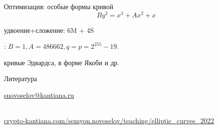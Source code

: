 \documentclass{beamer}
\begin{document}
	\begin{frame}{Оптимизация: особые формы кривой}
		\[
		B y^2 = x^3 + A x^2 + x
		\]
		\begin{center}
			\begin{tcolorbox}[enhanced,hbox,colback=box-blue-color!15,colframe=box-blue-color,title=Сложность,center title]
				\begin{varwidth}{\textwidth}
					удвоение+сложение: $6$M + $4$S
				\end{varwidth}
			\end{tcolorbox}	
		\end{center}
		: $B = 1, A = 486662, q=p=2^{255} - 19$.
		
		 кривые Эдвардса, в форме Якоби и др.
	\end{frame}
	
	
	\begin{frame}{Литература}
		\nocite{Menezes1993}\nocite{Blake1999}\nocite{Washington2008}
		\printbibliography
		
		\begin{center}
			\begin{tcolorbox}[enhanced,hbox,colback=block-green-color-bg,colframe=subsection-color!120,title=Контакты,center title]
				\begin{varwidth}{\textwidth}
					\begin{center}
						\href{mailto:snovoselov@kantiana.ru}{snovoselov@kantiana.ru}
					\end{center}
				\end{varwidth}
			\end{tcolorbox}	
		\end{center}
		
		\\
		{\footnotesize
			\href{https://crypto-kantiana.com/semyon.novoselov/teaching/elliptic_curves_2022}{crypto-kantiana.com/semyon.novoselov/teaching/elliptic\_curves\_2022}
		}
		
	\end{frame}
	
\end{document}
